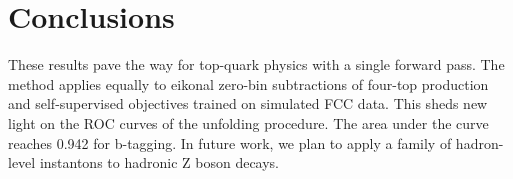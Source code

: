 \section{Conclusions}\label{sec:conclusions}

These results pave the way for top-quark physics with a single forward
pass. The method applies equally to eikonal zero-bin subtractions of
four-top production and self-supervised objectives trained on simulated
FCC data. This sheds new light on the ROC curves of the unfolding
procedure. The area under the curve reaches 0.942 for b-tagging. In
future work, we plan to apply a family of hadron-level instantons to
hadronic Z boson decays.

